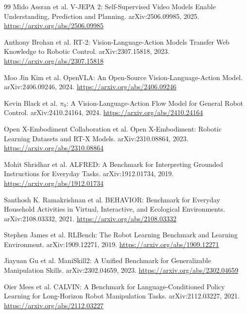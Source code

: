 \documentclass[11pt,a4paper]{ctexart}
\begin{document}
\begin{thebibliography}{99}
Mido Assran et al.
\newblock V-JEPA 2: Self-Supervised Video Models Enable Understanding, Prediction and Planning.
\newblock arXiv:2506.09985, 2025.
\newblock \url{https://arxiv.org/abs/2506.09985}

Anthony Brohan et al.
\newblock RT-2: Vision-Language-Action Models Transfer Web Knowledge to Robotic Control.
\newblock arXiv:2307.15818, 2023.
\newblock \url{https://arxiv.org/abs/2307.15818}

Moo Jin Kim et al.
\newblock OpenVLA: An Open-Source Vision-Language-Action Model.
\newblock arXiv:2406.09246, 2024.
\newblock \url{https://arxiv.org/abs/2406.09246}

Kevin Black et al.
\newblock $\pi_0$: A Vision-Language-Action Flow Model for General Robot Control.
\newblock arXiv:2410.24164, 2024.
\newblock \url{https://arxiv.org/abs/2410.24164}

Open X-Embodiment Collaboration et al.
\newblock Open X-Embodiment: Robotic Learning Datasets and RT-X Models.
\newblock arXiv:2310.08864, 2023.
\newblock \url{https://arxiv.org/abs/2310.08864}

Mohit Shridhar et al.
\newblock ALFRED: A Benchmark for Interpreting Grounded Instructions for Everyday Tasks.
\newblock arXiv:1912.01734, 2019.
\newblock \url{https://arxiv.org/abs/1912.01734}

Santhosh K. Ramakrishnan et al.
\newblock BEHAVIOR: Benchmark for Everyday Household Activities in Virtual, Interactive, and Ecological Environments.
\newblock arXiv:2108.03332, 2021.
\newblock \url{https://arxiv.org/abs/2108.03332}

Stephen James et al.
\newblock RLBench: The Robot Learning Benchmark and Learning Environment.
\newblock arXiv:1909.12271, 2019.
\newblock \url{https://arxiv.org/abs/1909.12271}

Jiayuan Gu et al.
\newblock ManiSkill2: A Unified Benchmark for Generalizable Manipulation Skills.
\newblock arXiv:2302.04659, 2023.
\newblock \url{https://arxiv.org/abs/2302.04659}

Oier Mees et al.
\newblock CALVIN: A Benchmark for Language-Conditioned Policy Learning for Long-Horizon Robot Manipulation Tasks.
\newblock arXiv:2112.03227, 2021.
\newblock \url{https://arxiv.org/abs/2112.03227}


\end{thebibliography}
\end{document}

